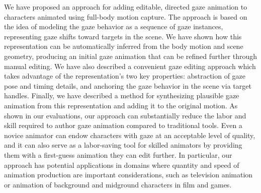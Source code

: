 
We have proposed an approach for adding editable, directed gaze animation to characters animated using full-body motion capture. The approach is based on the idea of modeling the gaze behavior as a sequence of gaze instances, representing gaze shifts toward targets in the scene. We have shown how this representation can be automatically inferred from the body motion and scene geometry, producing an initial gaze animation that can be refined further through manual editing. We have also described a convenient gaze editing approach which takes advantage of the representation's two key properties: abstraction of gaze pose and timing details, and anchoring the gaze behavior in the scene via target handles. Finally, we have described a method for synthesizing plausible gaze animation from this representation and adding it to the original motion. As shown in our evaluations, our approach can substantially reduce the labor and skill required to author gaze animation compared to traditional tools. Even a novice animator can endow characters with gaze at an acceptable level of quality, and it can also serve as a labor-saving tool for skilled animators by providing them with a first-guess animation they can edit further. In particular, our approach has potential applications in domains where quantity and speed of animation production are important considerations, such as television animation or animation of background and midground characters in film and games. 
